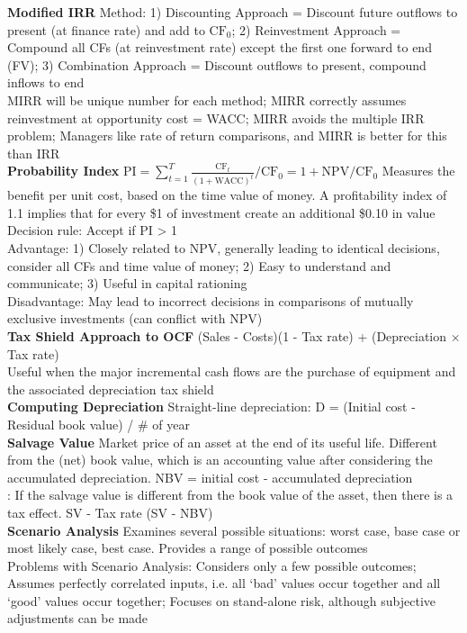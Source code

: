 \documentclass[12pt,landscape, a4paper]{article}
\theoremstyle{remark}
\begin{document}
\begin{multicols*}{3}
\textbf{Modified IRR} Method: 1) Discounting Approach = Discount future outflows to present (at finance rate) and add to $\mathrm{CF}_0$; 2) Reinvestment Approach = Compound all CFs (at reinvestment rate) except the first one forward to end (FV); 3) Combination Approach = Discount outflows to present, compound inflows to end\\
MIRR will be unique number for each method; MIRR correctly assumes reinvestment at opportunity cost = WACC; MIRR avoids the multiple IRR problem; Managers like rate of return comparisons, and MIRR is better for this than IRR\\

\textbf{Probability Index} $\text{PI} = \sum^T_{t=1} \frac{\text{CF}_t}{(1+ \text{WACC})^t} / \text{CF}_0 = 1 + \text{NPV} / \text{CF}_0$ Measures the benefit per unit cost, based on the time value of money. A profitability index of 1.1 implies that for every \$1 of investment create an additional \$0.10 in value\\
Decision rule: Accept if PI > 1\\
Advantage: 1) Closely related to NPV, generally leading to identical decisions, consider all CFs and time value of money; 2) Easy to understand and communicate; 3) Useful in capital rationing\\
Disadvantage: May lead to incorrect decisions in comparisons of mutually exclusive investments (can conflict with NPV)\\

\textbf{Tax Shield Approach to OCF} (Sales - Costs)(1 - Tax rate) + (Depreciation $\times$ Tax rate)\\
Useful when the major incremental cash flows are the purchase of equipment and the associated depreciation tax shield\\

\textbf{Computing Depreciation} Straight-line depreciation: D = (Initial cost - Residual book value) / \# of year\\

\textbf{Salvage Value} Market price of an asset at the end of its useful life. Different from the (net) book value, which is an accounting value after considering the accumulated depreciation. NBV = initial cost - accumulated depreciation\\
: If the salvage value is different from the book value of the asset, then there is a tax effect. SV - Tax rate (SV - NBV)\\

\textbf{Scenario Analysis} Examines several possible situations: worst case, base case or most likely case, best case. Provides a range of possible outcomes\\
Problems with Scenario Analysis: Considers only a few possible outcomes; Assumes perfectly correlated inputs, i.e. all `bad' values occur together and all `good' values occur together; Focuses on stand-alone risk, although subjective adjustments can be made\\


\end{multicols*}
\end{document}
